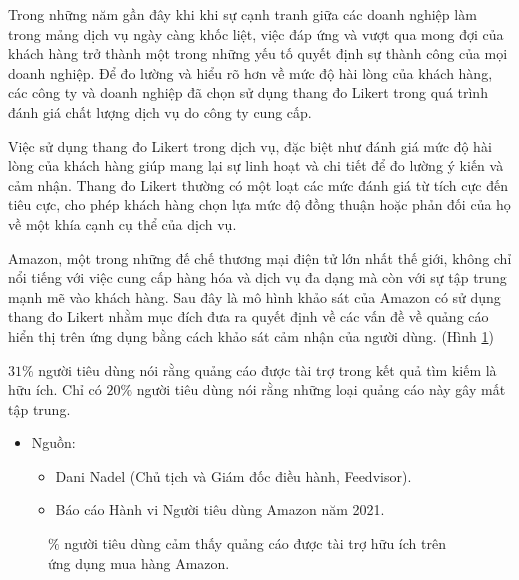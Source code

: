 \documentclass[12pt]{article}
\begin{document}
Trong những năm gần đây khi khi sự cạnh tranh giữa các doanh nghiệp làm trong mảng dịch vụ ngày càng khốc liệt, việc đáp ứng và vượt qua mong đợi của khách hàng trở thành một trong những yếu tố quyết định sự thành công của mọi doanh nghiệp. Để đo lường và hiểu rõ hơn về mức độ hài lòng của khách hàng, các công ty và doanh nghiệp đã chọn sử dụng thang đo Likert trong quá trình đánh giá chất lượng dịch vụ do công ty cung cấp.

Việc sử dụng thang đo Likert trong dịch vụ, đặc biệt như đánh giá mức độ hài lòng của khách hàng giúp mang lại sự linh hoạt và chi tiết để đo lường ý kiến và cảm nhận. Thang đo Likert thường có một loạt các mức đánh giá từ tích cực đến tiêu cực, cho phép khách hàng chọn lựa mức độ đồng thuận hoặc phản đối của họ về một khía cạnh cụ thể của dịch vụ.

Amazon, một trong những đế chế thương mại điện tử lớn nhất thế giới, không chỉ nổi tiếng với việc cung cấp hàng hóa và dịch vụ đa dạng mà còn với sự tập trung mạnh mẽ vào khách hàng. Sau đây là mô hình khảo sát của Amazon có sử dụng thang đo Likert nhằm mục đích đưa ra quyết định về các vấn đề về quảng cáo hiển thị trên ứng dụng bằng cách khảo sát cảm nhận của người dùng. (Hình \ref{amazon})

$31\%$ người tiêu dùng nói rằng quảng cáo được tài trợ trong kết quả tìm kiếm là hữu ích. Chỉ có $20\%$ người tiêu dùng nói rằng những loại quảng cáo này gây mất tập trung.
\begin{itemize}
\item Nguồn:
\begin{itemize}
\item Dani Nadel (Chủ tịch và Giám đốc điều hành, Feedvisor).
\item Báo cáo Hành vi Người tiêu dùng Amazon năm 2021.
\end{itemize}
\end{itemize}
\testdata
\begin{figure}
\centering
{}
\caption{\centering $\%$ người tiêu dùng cảm thấy quảng cáo được tài trợ hữu ích trên ứng dụng mua hàng Amazon.}
\label{amazon}
\end{figure}
\end{document}
